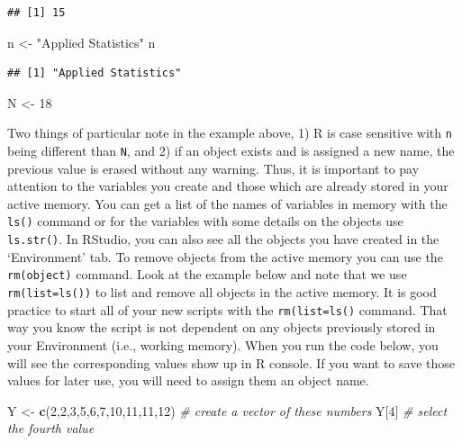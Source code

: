 \documentclass[
]{book}
\newenvironment{Shaded}{\begin{snugshade}}{\end{snugshade}}
\newcommand{\CommentTok}[1]{\textcolor[rgb]{0.56,0.35,0.01}{\textit{#1}}}
\newcommand{\DecValTok}[1]{\textcolor[rgb]{0.00,0.00,0.81}{#1}}
\newcommand{\FunctionTok}[1]{\textcolor[rgb]{0.13,0.29,0.53}{\textbf{#1}}}
\newcommand{\NormalTok}[1]{#1}
\newcommand{\OtherTok}[1]{\textcolor[rgb]{0.56,0.35,0.01}{#1}}
\newcommand{\StringTok}[1]{\textcolor[rgb]{0.31,0.60,0.02}{#1}}
\begin{document}
\begin{verbatim}
## [1] 15
\end{verbatim}

\begin{Shaded}
\begin{Highlighting}[]
\NormalTok{n }\OtherTok{\textless{}{-}} \StringTok{"Applied Statistics"}
\NormalTok{n}
\end{Highlighting}
\end{Shaded}

\begin{verbatim}
## [1] "Applied Statistics"
\end{verbatim}

\begin{Shaded}
\begin{Highlighting}[]
\NormalTok{N }\OtherTok{\textless{}{-}} \DecValTok{18}
\end{Highlighting}
\end{Shaded}

Two things of particular note in the example above, 1) R is case sensitive with \texttt{n} being different than \texttt{N}, and 2) if an object exists and is assigned a new name, the previous value is erased without any warning. Thus, it is important to pay attention to the variables you create and those which are already stored in your active memory. You can get a list of the names of variables in memory with the \texttt{ls()} command or for the variables with some details on the objects use \texttt{ls.str()}. In RStudio, you can also see all the objects you have created in the `Environment' tab. To remove objects from the active memory you can use the \texttt{rm(\textquotesingle{}object\textquotesingle{})} command. Look at the example below and note that we use \texttt{rm(list=ls())} to list and remove all objects in the active memory. It is good practice to start all of your new scripts with the \texttt{rm(list=ls()} command. That way you know the script is not dependent on any objects previously stored in your Environment (i.e., working memory). When you run the code below, you will see the corresponding values show up in R console. If you want to save those values for later use, you will need to assign them an object name.

\begin{Shaded}
\begin{Highlighting}[]
\NormalTok{Y }\OtherTok{\textless{}{-}} \FunctionTok{c}\NormalTok{(}\DecValTok{2}\NormalTok{,}\DecValTok{2}\NormalTok{,}\DecValTok{3}\NormalTok{,}\DecValTok{5}\NormalTok{,}\DecValTok{6}\NormalTok{,}\DecValTok{7}\NormalTok{,}\DecValTok{10}\NormalTok{,}\DecValTok{11}\NormalTok{,}\DecValTok{11}\NormalTok{,}\DecValTok{12}\NormalTok{)  }\CommentTok{\# create a vector of these numbers}
\NormalTok{Y[}\DecValTok{4}\NormalTok{]  }\CommentTok{\# select the fourth value}
\end{Highlighting}
\end{Shaded}
\end{document}
